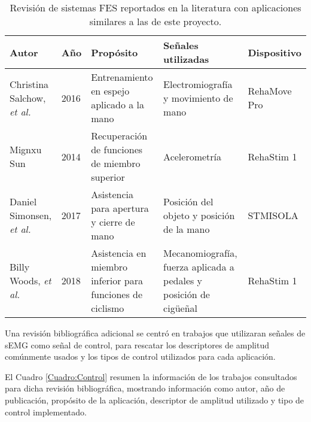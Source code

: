 \begin{table}[hbt]
	\centering
	\begin{tabular}{|p{30mm}|p{10mm}|p{40mm}|p{40mm}|p{25mm}|}
	\hline
	\textbf{Autor} & \textbf{Año} & \textbf{Propósito} & \textbf{Señales utilizadas} & \textbf{Dispositivo}\\ 
	\hline
	\hline
	Christina Salchow, \emph{et al.} \cite{Salchow2016} & 2016 & Entrenamiento en espejo aplicado a la mano & Electromiografía y movimiento de mano & RehaMove Pro\\
	\hline
	Mignxu Sun \cite{Sun2014} & 2014 & Recuperación de funciones de miembro superior & Acelerometría & RehaStim 1\\
	\hline
	Daniel Simonsen, \emph{et al.} \cite{Simonsen2017} & 2017 & Asistencia para apertura y cierre de mano & Posición del objeto y posición de la mano & STMISOLA\\
	\hline
	Billy Woods, \emph{et al.} \cite{Woods2018} & 2018 & Asistencia en miembro inferior para funciones de ciclismo & Mecanomiografía, fuerza aplicada a pedales y posición de cigüeñal & RehaStim 1\\
	\hline
	\end{tabular}
	\caption{Revisión de sistemas FES reportados en la literatura con aplicaciones similares a las de este proyecto.}
	\label{Cuadro:Sistemas FES}
\end{table}

Una revisión bibliográfica adicional se centró en trabajos que utilizaran señales de sEMG como señal de control, para rescatar los descriptores de amplitud comúnmente usados y los tipos de control utilizados para cada aplicación.

El Cuadro \ref{Cuadro:Control} resumen la información de los trabajos consultados para dicha revisión bibliográfica, mostrando información como autor, año de publicación, propósito de la aplicación, descriptor de amplitud utilizado y tipo de control implementado.

